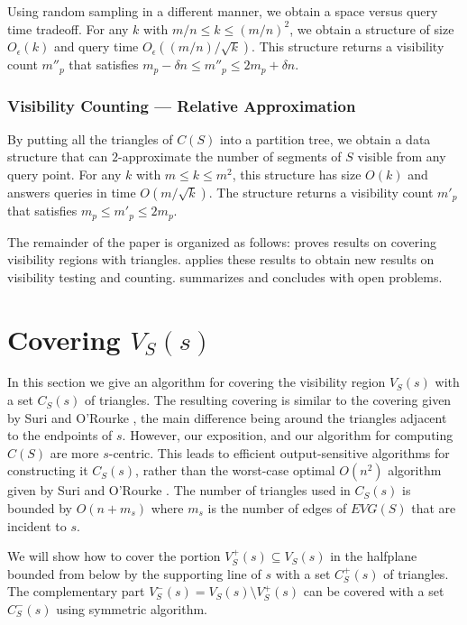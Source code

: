 \documentclass{patmorin}
\newcommand{\EVG}{\mathit{EVG}}
\newcommand{\Oe}{O_\epsilon}
\begin{document}
Using random sampling in a different manner, we obtain a space versus query
time tradeoff. For any $k$ with $m/n \le k \le (m/n)^2$, we obtain a
structure of size $\Oe(k)$ and query time $\Oe((m/n)/\sqrt{k})$.  This
structure returns a visibility count $m''_p$ that satisfies $m_p-\delta n
\le m''_p \le 2m_p + \delta n$.  

\subsubsection{Visibility Counting --- Relative Approximation} 

By putting all the triangles of $C(S)$ into a partition tree, we obtain
a data structure that can $2$-approximate the number of segments of $S$
visible from any query point.  For any $k$ with $m\le k\le m^2$, this
structure has size $O(k)$ and answers queries in time $O(m/\sqrt{k})$.  The
structure returns a visibility count $m'_p$ that satisfies $m_p \le m'_p\le
2m_p$.

The remainder of the paper is organized as follows:  
proves results on covering visibility regions with triangles.
 applies these results to obtain new results on
visibility testing and counting.  summarizes and
concludes with open problems.

\section{Covering $V_S(s)$}

In this section we give an algorithm for covering the visibility region
$V_S(s)$ with a set $C_S(s)$ of triangles.  The resulting covering is
similar to the covering given by Suri and O'Rourke \cite{so84}, the main
difference being around the triangles adjacent to the endpoints of $s$.
However, our exposition, and our algorithm for computing $C(S)$ are more
$s$-centric.  This leads to efficient output-sensitive algorithms for
constructing it $C_S(s)$, rather than the worst-case optimal $O(n^2)$
algorithm given by Suri and O'Rourke \cite{so84}.
The number of triangles used in $C_S(s)$ is bounded by $O(n+m_s)$ where
$m_s$ is the number of edges of $\EVG(S)$ that are incident to $s$.

We will show how to cover the portion $V^+_S(s)\subseteq V_S(s)$ in the
halfplane bounded from below by the supporting line of $s$ with a set
$C^+_S(s)$ of triangles.  The complementary part $V^-_S(s)=V_S(s)\setminus
V^+_S(s)$ can be covered with a set $C^-_S(s)$ using symmetric algorithm.
\end{document}
